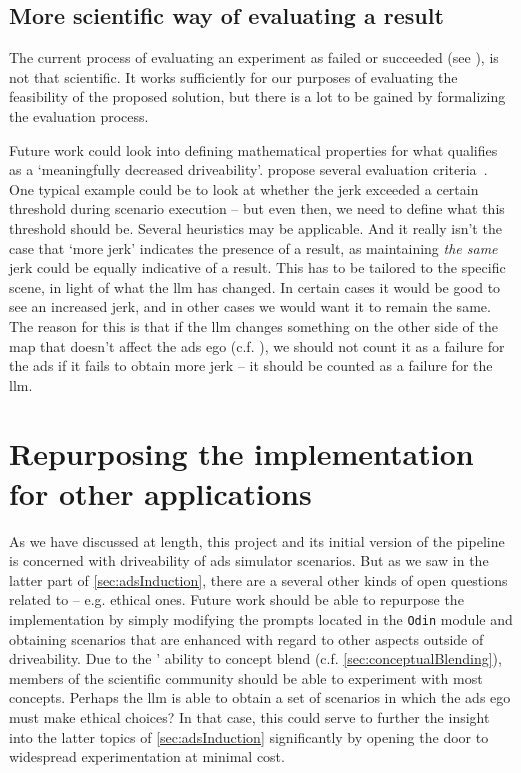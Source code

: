 \newpage %

\subsection{More scientific way of evaluating a result}\label{sec:fwDetermine}

The current process of evaluating an experiment as failed or succeeded (see
), is not that scientific. It works sufficiently for our purposes of
evaluating the feasibility of the proposed solution, but there is a lot to be gained by formalizing
the evaluation process.

Future work could look into defining mathematical properties for what qualifies as a `meaningfully
decreased driveability'. \citeauthor{adsQualityMetrics21} propose several evaluation
criteria~\cite[196]{adsQualityMetrics21}. One typical example could be to look at whether the jerk
exceeded a certain threshold during scenario execution -- but even then, we need to define what
this threshold should be. Several heuristics may be applicable. And it really isn't the case that
`more jerk' indicates the presence of a result, as maintaining \emph{the same} jerk could be equally
indicative of a result. This has to be tailored to the specific scene, in light of what the
\acrshort{llm} has changed. In certain cases it would be good to see an increased jerk, and in other
cases we would want it to remain the same. The reason for this is that if the \acrshort{llm} changes
something on the other side of the map that doesn't affect the \acrshort{ads} ego (c.f.
), we should not count it as a failure for the \acrshort{ads} if it
fails to obtain more jerk -- it should be counted as a failure for the \acrshort{llm}.

\section{Repurposing the \hefe{} implementation for other applications}

As we have discussed at length, this project and its initial version of the \hefe{} pipeline is
concerned with driveability of \acrshort{ads} simulator scenarios. But as we saw in the latter part
of \cref{sec:adsInduction}, there are a several other kinds of open questions related to
 -- e.g. ethical ones. Future work should be able to repurpose the \hefe{}
implementation by simply modifying the prompts located in the \texttt{Odin} module and obtaining
scenarios that are enhanced with regard to other aspects outside of driveability. Due to the
' ability to concept blend (c.f. \cref{sec:conceptualBlending}), members of the
scientific community should be able to experiment with most concepts. Perhaps the \acrshort{llm} is
able to obtain a set of scenarios in which the \acrshort{ads} ego must make ethical choices?
In that case, this could serve to further the insight into the latter topics of
\cref{sec:adsInduction} significantly by opening the door to widespread experimentation at
minimal cost.